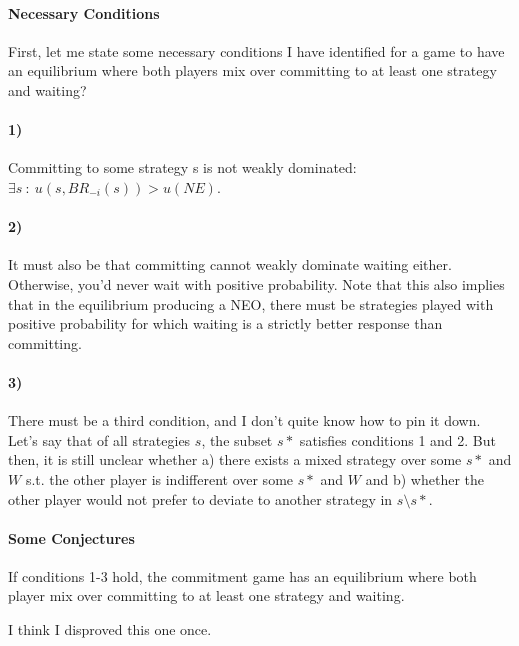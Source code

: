 \documentclass{article}
\begin{document}
\paragraph{Necessary Conditions}

First, let me state some necessary conditions I have identified for a game to have an equilibrium where both players mix over committing to at least one strategy and waiting?

\paragraph{1)} Committing to some strategy s is not weakly dominated: $\exists s\ :\ u(s,BR_{-i}(s))>u(NE)$.

\paragraph{2)} It must also be that committing cannot weakly dominate waiting either. Otherwise, you'd never wait with positive probability. Note that this also implies that in the equilibrium producing a NEO, there must be strategies played with positive probability for which waiting is a strictly better response than committing.

\paragraph{3)} There must be a third condition, and I don't quite know how to pin it down. Let's say that of all strategies $s$, the subset $s*$ satisfies conditions 1 and 2. But then, it is still unclear whether a) there exists a mixed strategy over some $s*$ and $W$ s.t. the other player is indifferent over some $s*$ and $W$ and b) whether the other player would not prefer to deviate to another strategy in $s \setminus s*$. \newline


\paragraph{Some Conjectures}

\begin{conjecture}
    If conditions 1-3 hold, the commitment game has an equilibrium where both player mix over committing to at least one strategy and waiting.
\end{conjecture}
I think I disproved this one once.
\end{document}
